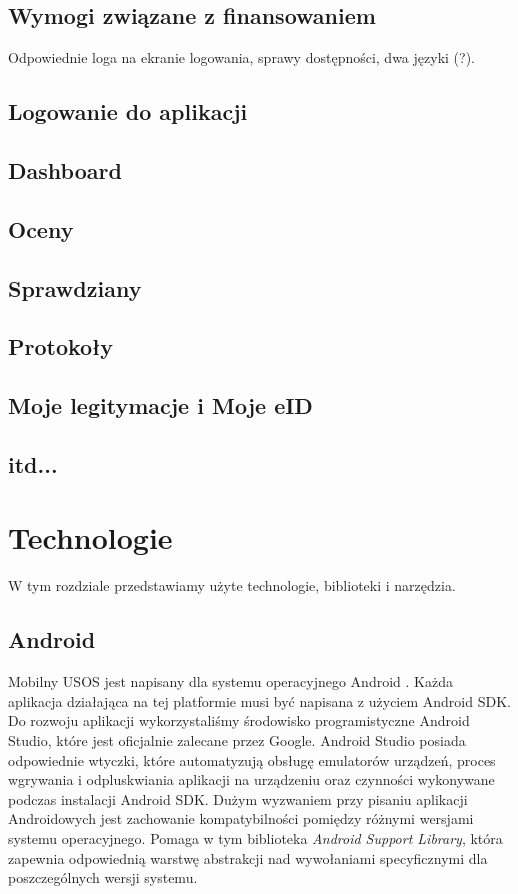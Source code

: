 \documentclass{pracamgr}
\begin{document}
\section{Wymogi związane z finansowaniem}

Odpowiednie loga na ekranie logowania, sprawy dostępności, dwa języki (?).

\section{Logowanie do aplikacji}

\section{Dashboard}

\section{Oceny}

\section{Sprawdziany}

\section{Protokoły}

\section{Moje legitymacje i Moje eID}

\section{itd...}

\chapter{Technologie}

W tym rozdziale przedstawiamy użyte technologie, biblioteki i narzędzia.

\section{Android}

Mobilny USOS jest napisany dla systemu operacyjnego Android \cite{android}.
Każda aplikacja działająca na tej platformie musi być napisana z użyciem Android
SDK. Do rozwoju aplikacji wykorzystaliśmy środowisko programistyczne Android Studio,
które jest oficjalnie zalecane przez Google. Android Studio posiada odpowiednie
wtyczki, które automatyzują obsługę emulatorów urządzeń, proces wgrywania i
odpluskwiania aplikacji na urządzeniu oraz czynności wykonywane podczas instalacji
Android SDK. Dużym wyzwaniem przy pisaniu aplikacji Androidowych jest zachowanie
kompatybilności pomiędzy różnymi wersjami systemu operacyjnego. Pomaga w tym
biblioteka \textit{Android Support Library}, która zapewnia odpowiednią warstwę
abstrakcji nad wywołaniami specyficznymi dla poszczególnych wersji systemu.
\end{document}

